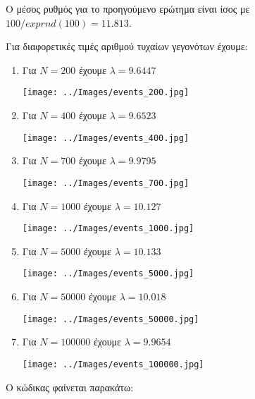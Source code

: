 \documentclass[12pt]{article}
\begin{document}
Ο μέσος ρυθμός για το προηγούμενο ερώτημα είναι ίσος με $100/exprnd(100) = 11.813$.\\

\pagebreak

Για διαφορετικές τιμές αριθμού τυχαίων γεγονότων έχουμε: 
\begin{enumerate}
    \item{Για $Ν = 200$ έχουμε $\lambda = 9.6447$}
        \begin{center}
            \texttt{[image: ../Images/events\_200.jpg]}
        \end{center}
    \item{Για $Ν = 400$ έχουμε $\lambda = 9.6523$}
        \begin{center}
            \texttt{[image: ../Images/events\_400.jpg]}
        \end{center}
    \item{Για $Ν = 700$ έχουμε $\lambda = 9.9795$}
        \begin{center}
            \texttt{[image: ../Images/events\_700.jpg]}
        \end{center}
    \item{Για $Ν = 1000$ έχουμε $\lambda = 10.127$}
        \begin{center}
            \texttt{[image: ../Images/events\_1000.jpg]}
        \end{center}
    \item{Για $Ν = 5000$ έχουμε $\lambda = 10.133$}
        \begin{center}
            \texttt{[image: ../Images/events\_5000.jpg]}
        \end{center}
    \item{Για $Ν = 50000$ έχουμε $\lambda = 10.018$}
        \begin{center}
            \texttt{[image: ../Images/events\_50000.jpg]}
        \end{center}

    \pagebreak

    \item{Για $Ν = 100000$ έχουμε $\lambda = 9.9654$}
        \begin{center}
            \texttt{[image: ../Images/events\_100000.jpg]}
        \end{center}
\end{enumerate}

Ο κώδικας φαίνεται παρακάτω:
\end{document}
